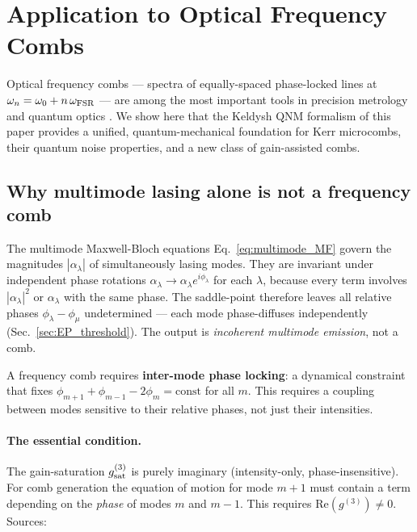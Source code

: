 \documentclass[12pt]{article}
\begin{document}
\section{Application to Optical Frequency Combs}
\label{sec:comb}

Optical frequency combs --- spectra of equally-spaced phase-locked lines
at $\omega_n = \omega_0 + n\,\omega_{\rm FSR}$ --- are among the most
important tools in precision metrology and quantum optics \cite{Udem2002}.
We show here that the Keldysh QNM formalism of this paper provides a
unified, quantum-mechanical foundation for Kerr microcombs, their quantum
noise properties, and a new class of gain-assisted combs.

\subsection{Why multimode lasing alone is not a frequency comb}

The multimode Maxwell-Bloch equations Eq.~\eqref{eq:multimode_MF} govern
the magnitudes $|\alpha_\lambda|$ of simultaneously lasing modes.  They
are invariant under independent phase rotations
$\alpha_\lambda\to\alpha_\lambda e^{i\phi_\lambda}$ for each $\lambda$,
because every term involves $|\alpha_\lambda|^2$ or $\alpha_\lambda$ with the
same phase.  The saddle-point therefore leaves all relative phases
$\phi_\lambda - \phi_\mu$ undetermined --- each mode phase-diffuses
independently (Sec.~\ref{sec:EP_threshold}).  The output is
\emph{incoherent multimode emission}, not a comb.

A frequency comb requires \textbf{inter-mode phase locking}: a dynamical
constraint that fixes $\phi_{m+1} + \phi_{m-1} - 2\phi_m = \mathrm{const}$
for all $m$.  This requires a coupling between modes sensitive to their
relative phases, not just their intensities.

\paragraph{The essential condition.}
The gain-saturation $g^{(3)}_{\rm sat}$ is purely imaginary (intensity-only,
phase-insensitive).  For comb generation the equation of motion for mode
$m+1$ must contain a term depending on the \emph{phase} of modes $m$ and
$m-1$.  This requires $\mathrm{Re}(g^{(3)}) \neq 0$.  Sources:
\end{document}
